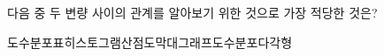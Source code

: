 다음 중 두 변량 사이의 관계를 알아보기 위한 것으로 가장 적당한 것은?
\begin{choicesii}{도수분포표}{히스토그램}{산점도}{막대그래프}{도수분포다각형}\end{choicesii}
